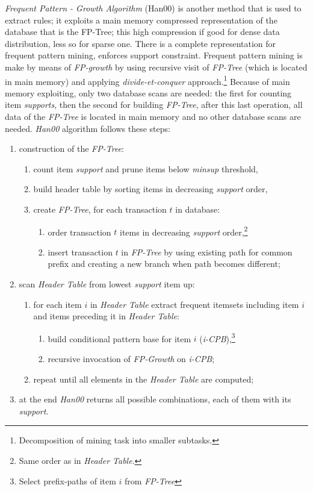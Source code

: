 \emph{Frequent Pattern - Growth Algorithm} (Han00) is another method that is used to extract rules; it exploits a main memory compressed representation of the database that is the FP-Tree; this high compression if good for dense data distribution, less so for sparse one.
There is a complete representation for frequent pattern mining, enforces support constraint.
Frequent pattern mining is make by means of \emph{FP-growth} by using recursive visit of \emph{FP-Tree} (which is located in main memory) and applying \emph{divide-et-conquer} approach.\footnote{Decomposition of mining task into smaller subtasks.}
Because of main memory exploiting, only two database scans are needed: the first for counting item \emph{supports}, then the second for building \emph{FP-Tree}, after this last operation, all data of the \emph{FP-Tree} is located in main memory and no other database scans are needed.
\emph{Han00} algorithm follows these steps:
\begin{enumerate}
	\item
	construction of the \emph{FP-Tree}:
	\begin{enumerate}
		\item
		count item \emph{support} and prune items below \emph{minsup} threshold,
		\item
		build header table by sorting items in decreasing \emph{support} order,
		\item
		create \emph{FP-Tree}, for each transaction $t$ in database:
		\begin{enumerate}
			\item
			order transaction $t$ items in decreasing \emph{support} order,\footnote{Same order as in \emph{Header Table}.}
			\item
			insert transaction $t$ in \emph{FP-Tree} by using existing path for common prefix and creating a new branch when path becomes different;
		\end{enumerate}
	\end{enumerate}
	\item
	scan \emph{Header Table} from lowest \emph{support} item up:
	\begin{enumerate}
		\item
		for each item $i$ in \emph{Header Table} extract frequent itemsets including item $i$ and items preceding it in \emph{Header Table}:
		\begin{enumerate}
			\item
			build conditional pattern base for item $i$ (\emph{i-CPB}),\footnote{Select prefix-paths of item $i$ from \emph{FP-Tree}}
			\item
			recursive invocation of \emph{FP-Growth} on \emph{i-CPB};
		\end{enumerate}
		\item
		repeat until all elements in the \emph{Header Table} are computed;
	\end{enumerate}
	\item
	at the end \emph{Han00} returns all possible combinations, each of them with its \emph{support}.
\end{enumerate}

